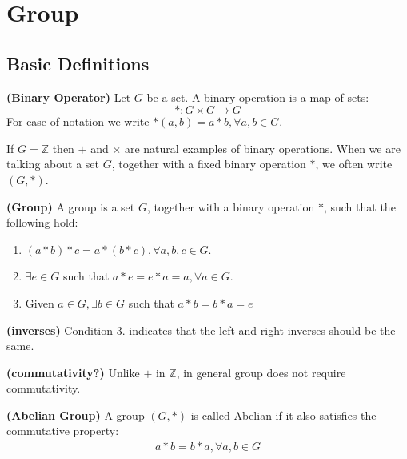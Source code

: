 \documentclass{article}
\newcommand{\bfs}[1]{\textbf{({#1}) }}
\begin{document}
\section{Group}
\subsection{Basic Definitions}
\begin{defa}{\bfs{Binary Operator}}
 Let $G$ be a set. A binary operation is a map of sets:
$$*: G \times G \rightarrow G$$
For ease of notation we write $*(a, b)=a * b, \forall a, b \in G$. 
\begin{rema}
If $G=\mathbb{Z}$ then $+$ and $\times$ are natural examples of binary operations. When we are talking about a set $G$, together with a fixed binary operation $*$, we often write $(G, *)$.
\end{rema}
\end{defa}
\begin{defa}{\bfs{Group}}
 A group is a set $G$, together with a binary operation $*$, such that the following hold:
 \begin{enumerate}
     \item {} $(a * b) * c=a *(b * c), \forall a, b, c \in G$.
     \item {} $\exists e \in G$ such that $a * e=e * a=a, \forall a \in G$.
     \item {} Given $a \in G, \exists b \in G$ such that $a * b=b * a=e$
 \end{enumerate}
\end{defa} 
\begin{rema}{\bfs{inverses}}
Condition 3. indicates that the left and right inverses should be the same.
\end{rema}
\begin{rema}{\bfs{commutativity?}}
Unlike $+$ in $\mathbb{Z}$, in general group does not require commutativity.
\end{rema}
\begin{defa}{\bfs{Abelian Group}}
 A group $(G, *)$ is called Abelian if it also satisfies the  commutative property: 
\begin{align*}
a * b=b * a, \forall a, b \in G
\end{align*}
\end{defa}
\end{document}
